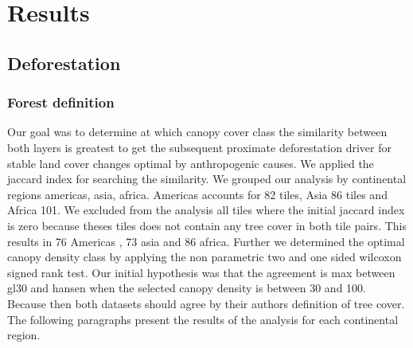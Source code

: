 \chapter{Results}
\label{ch:results}

	\section{Deforestation}
	\label{sec:results_deforestation}

		\subsection{Forest definition}
		\label{subsec:results_forest_definition}
			 Our goal was to determine at which canopy cover class the similarity between both layers is greatest to get the subsequent proximate deforestation driver for stable land cover changes optimal by anthropogenic causes. We applied the jaccard index for searching the similarity. We grouped our analysis by continental regions americas, asia, africa. Americas accounts for 82 tiles, Asia 86 tiles and Africa 101. We excluded from the analysis all tiles where the initial jaccard index is zero because theses tiles does not contain any tree cover in both tile pairs. This results in 76 Americas , 73 asia and 86 africa. Further we determined the optimal canopy density class by applying the non parametric two and one sided wilcoxon signed rank test. Our initial hypothesis was that the agreement is max between gl30 and hansen when the selected canopy density is between 30 and 100. Because then both datasets should agree by their authors definition of tree cover. The following paragraphs present the results of the analysis for each continental region. 


